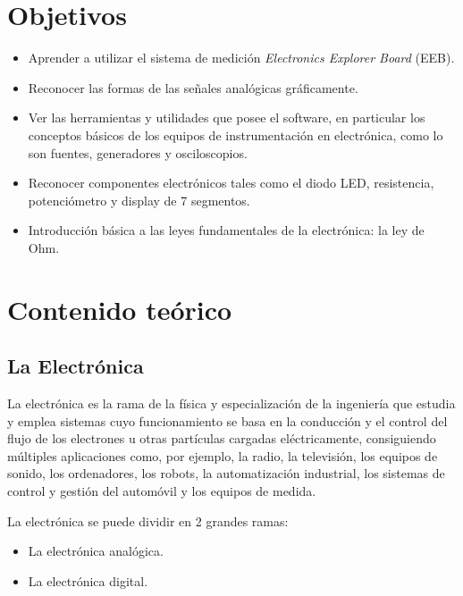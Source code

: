 \documentclass[11pt,a4paper]{article}
\begin{document}
\vspace{1.2cm}

\section{Objetivos}
\begin{itemize}
    \item Aprender a utilizar el sistema de medición \emph{Electronics Explorer Board} (EEB).
    \item Reconocer las formas de las señales analógicas gráficamente.
    \item Ver las herramientas y utilidades que posee el software, en particular los conceptos
          básicos de los equipos de instrumentación en electrónica, como lo son fuentes,
          generadores y osciloscopios.
    \item Reconocer componentes electrónicos tales como el diodo LED, resistencia,
          potenciómetro y display de 7 segmentos.
    \item Introducción básica a las leyes fundamentales de la electrónica: la ley de Ohm.
\end{itemize}

\section{Contenido teórico}
\subsection{La Electrónica}

La electrónica es la rama de la física y especialización de la ingeniería que estudia y emplea
sistemas cuyo funcionamiento se basa en la conducción y el control del flujo de los electrones
u otras partículas cargadas eléctricamente, consiguiendo múltiples aplicaciones como, por ejemplo,
la radio, la televisión, los equipos de sonido, los ordenadores, los robots, la automatización
industrial, los sistemas de control y gestión del automóvil y los equipos de medida.

La electrónica se puede dividir en 2 grandes ramas:

\begin{itemize}
    \item La electrónica analógica.
    \item La electrónica digital.
\end{itemize}
\end{document}
